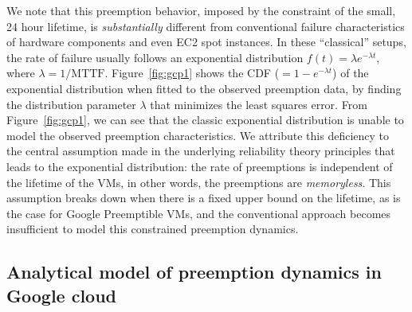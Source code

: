 
We note that this preemption behavior, imposed by the constraint of the small, 24 hour  lifetime, is \emph{substantially} different from conventional failure characteristics of hardware components and even EC2 spot instances.
In these ``classical'' setups, the rate of failure  usually follows an exponential distribution $f(t) = \lambda e^{-\lambda t}$, where $\lambda=1/\text{MTTF}$.
Figure~\ref{fig:gcp1} shows the CDF ($=1-e^{-\lambda t}$) of the exponential distribution when fitted to the observed preemption data, by finding the distribution parameter $\lambda$ that minimizes the least squares error.
From Figure~\ref{fig:gcp1}, we can see that the classic exponential distribution is unable to model the observed preemption characteristics.
We attribute this deficiency to the central assumption made in the underlying reliability theory principles that leads to the exponential distribution: the rate of preemptions is independent of the lifetime of the VMs, in other words, the preemptions are \emph{memoryless}.
This assumption breaks down when there is a fixed upper bound on the lifetime, as is the case for Google Preemptible VMs, and the conventional approach becomes insufficient to model this constrained preemption dynamics. 

\subsection{Analytical model of preemption dynamics in Google cloud}
\label{subsec:analytical-model}

